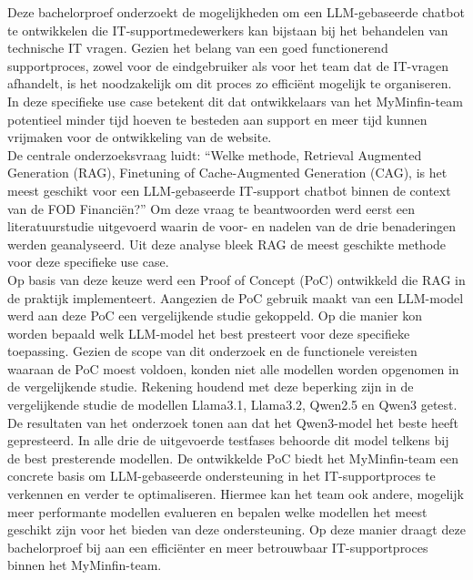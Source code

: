 Deze bachelorproef onderzoekt de mogelijkheden om een LLM-gebaseerde chatbot te ontwikkelen die IT-supportmedewerkers kan bijstaan bij het behandelen van technische IT vragen. Gezien het belang van een goed functionerend supportproces, zowel voor de eindgebruiker als voor het team dat de IT-vragen afhandelt, is het noodzakelijk om dit proces zo efficiënt mogelijk te organiseren. In deze specifieke use case betekent dit dat ontwikkelaars van het MyMinfin-team potentieel minder tijd hoeven te besteden aan support en meer tijd kunnen vrijmaken voor de ontwikkeling van de website.
\\[1em]
De centrale onderzoeksvraag luidt: “Welke methode, Retrieval Augmented Generation (RAG), Finetuning of Cache-Augmented Generation (CAG), is het meest geschikt voor een LLM-gebaseerde IT-support chatbot binnen de context van de FOD Financiën?” Om deze vraag te beantwoorden werd eerst een literatuurstudie uitgevoerd waarin de voor- en nadelen van de drie benaderingen werden geanalyseerd. Uit deze analyse bleek RAG de meest geschikte methode voor deze specifieke use case.
\\[1em]
Op basis van deze keuze werd een Proof of Concept (PoC) ontwikkeld die RAG in de praktijk implementeert. Aangezien de PoC gebruik maakt van een LLM-model werd aan deze PoC een vergelijkende studie gekoppeld. Op die manier kon worden bepaald welk LLM-model het best presteert voor deze specifieke toepassing. Gezien de scope van dit onderzoek en de functionele vereisten waaraan de PoC moest voldoen, konden niet alle modellen worden opgenomen in de vergelijkende studie. Rekening houdend met deze beperking zijn in de vergelijkende studie de modellen Llama3.1, Llama3.2, Qwen2.5 en Qwen3 getest.
\\[1em]
De resultaten van het onderzoek tonen aan dat het Qwen3-model het beste heeft gepresteerd. In alle drie de uitgevoerde testfases behoorde dit model telkens bij de best presterende modellen. De ontwikkelde PoC biedt het MyMinfin-team een concrete basis om LLM-gebaseerde ondersteuning in het IT-supportproces te verkennen en verder te optimaliseren. Hiermee kan het team ook andere, mogelijk meer performante modellen evalueren en bepalen welke modellen het meest geschikt zijn voor het bieden van deze ondersteuning. Op deze manier draagt deze bachelorproef bij aan een efficiënter en meer betrouwbaar IT-supportproces binnen het MyMinfin-team.